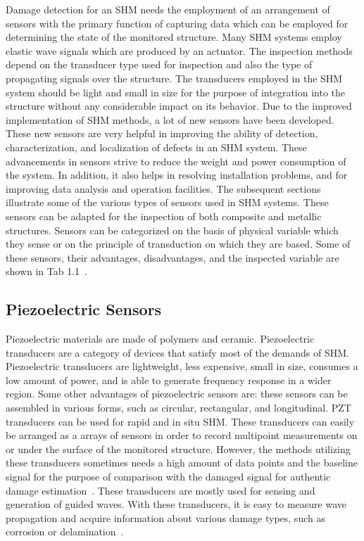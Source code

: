 \documentclass[b5paper, 11pt, titlepage]{book}
\begin{document}
Damage detection for an SHM needs the employment of an arrangement of sensors with the primary function of capturing data which can be employed for determining the state of the monitored structure. Many SHM systems employ elastic wave signals which are produced by an actuator. The inspection methods depend on the transducer type used for inspection and also the type of propagating signals over the structure. The transducers employed in the SHM system should be light and small in size for the purpose of integration into the structure without any considerable impact on its behavior. Due to the improved implementation of SHM methods, a lot of new sensors have been developed. These new sensors are very helpful in improving the ability of detection, characterization, and localization of defects in an SHM system. These advancements in sensors strive to reduce the weight and power consumption of the system. In addition, it also helps in resolving installation problems, and for improving data analysis and operation facilities. The subsequent sections illustrate some of the various types of sensors used in SHM systems. These sensors can be adapted for the inspection of both composite and metallic structures. Sensors can be categorized on the basis of physical variable which they sense or on the principle of transduction on which they are based. Some of these sensors, their advantages, disadvantages, and the inspected variable are shown in Tab 1.1~\cite{Farrar2012,TibaduizaBurgos2020}.

\subsection{Piezoelectric Sensors}
Piezoelectric materials are made of polymers and ceramic. Piezoelectric transducers are a category of devices that satisfy most of the demands of SHM. Piezoelectric transducers are lightweight, less expensive, small in size, consumes a low amount of power, and is able to generate frequency response in a wider region. Some other advantages of piezoelectric sensors are: these sensors can be assembled in various forms, such as circular, rectangular, and longitudinal. PZT transducers can be used for rapid and in situ SHM. These transducers can easily be arranged as a arrays of sensors in order to record multipoint measurements on or under the surface of the monitored structure. However, the methods utilizing these transducers sometimes needs a high amount of data points and the baseline signal for the purpose of comparison with the damaged signal for authentic damage estimation~\cite{Farrar2012,Hameed2019}.
These transducers are mostly used for sensing and generation of guided waves. With these transducers, it is easy to measure wave propagation and acquire information about various damage types, such as corrosion or delamination~\cite{TibaduizaBurgos2020,Mitra2016}.
\end{document}
